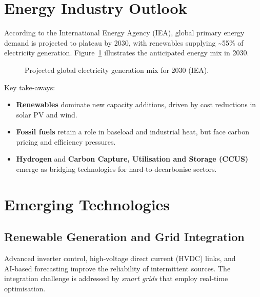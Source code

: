 \documentclass[conference]{IEEEtran}
\begin{document}
\section{Energy Industry Outlook}
According to the International Energy Agency (IEA)\cite{IEA2023}, global primary energy demand is projected to plateau by 2030, with renewables supplying \textasciitilde55\% of electricity generation.  Figure~\ref{fig:energy_mix} illustrates the anticipated energy mix in 2030.

\begin{figure}[!t]
\centering
{}
\caption{Projected global electricity generation mix for 2030 (IEA).}
\label{fig:energy_mix}
\end{figure}

Key take‑aways:
\begin{itemize}
  \item \textbf{Renewables} dominate new capacity additions, driven by cost reductions in solar PV and wind.
  \item \textbf{Fossil fuels} retain a role in baseload and industrial heat, but face carbon pricing and efficiency pressures.
  \item \textbf{Hydrogen} and \textbf{Carbon Capture, Utilisation and Storage (CCUS)} emerge as bridging technologies for hard‑to‑decarbonise sectors.
\end{itemize}

\section{Emerging Technologies}
\subsection{Renewable Generation and Grid Integration}
Advanced inverter control, high‑voltage direct current (HVDC) links, and AI‑based forecasting improve the reliability of intermittent sources.  The integration challenge is addressed by \textit{smart grids} that employ real‑time optimisation.
\end{document}
